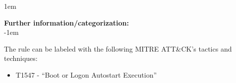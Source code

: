 \openup 1em

{\bf Further information/categorization:} \\

\openup -1em
\vspace{-2em}


The rule can be labeled with the following MITRE ATT\&CK's tactics and techniques:
\begin{itemize}
	\item T1547 - ``Boot or Logon Autostart Execution''
\end{itemize}

\pagebreak

